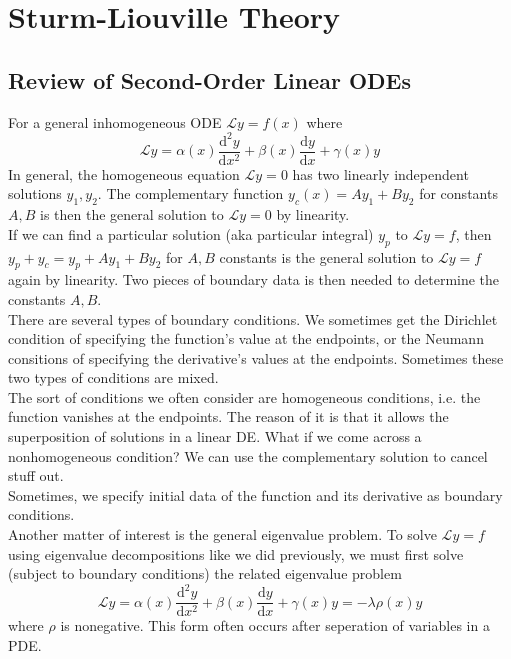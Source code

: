 \section{Sturm-Liouville Theory}
\subsection{Review of Second-Order Linear ODEs}
For a general inhomogeneous ODE $\mathcal Ly=f(x)$ where
$$\mathcal Ly=\alpha(x)\frac{\mathrm d^2y}{\mathrm dx^2}+\beta(x)\frac{\mathrm dy}{\mathrm dx}+\gamma(x)y$$
In general, the homogeneous equation $\mathcal Ly=0$ has two linearly independent solutions $y_1,y_2$.
The complementary function $y_c(x)=Ay_1+By_2$ for constants $A,B$ is then the general solution to $\mathcal Ly=0$ by linearity.\\
If we can find a particular solution (aka particular integral) $y_p$ to $\mathcal Ly=f$, then $y_p+y_c=y_p+Ay_1+By_2$ for $A,B$ constants is the general solution to $\mathcal Ly=f$ again by linearity.
Two pieces of boundary data is then needed to determine the constants $A,B$.\\
There are several types of boundary conditions.
We sometimes get the Dirichlet condition of specifying the function's value at the endpoints, or the Neumann consitions of specifying the derivative's values at the endpoints.
Sometimes these two types of conditions are mixed.\\
The sort of conditions we often consider are homogeneous conditions, i.e. the function vanishes at the endpoints.
The reason of it is that it allows the superposition of solutions in a linear DE.
What if we come across a nonhomogeneous condition?
We can use the complementary solution to cancel stuff out.\\
Sometimes, we specify initial data of the function and its derivative as boundary conditions.\\
Another matter of interest is the general eigenvalue problem.
To solve $\mathcal Ly=f$ using eigenvalue decompositions like we did previously, we must first solve (subject to boundary conditions) the related eigenvalue problem
$$\mathcal Ly=\alpha(x)\frac{\mathrm d^2y}{\mathrm dx^2}+\beta(x)\frac{\mathrm dy}{\mathrm dx}+\gamma(x)y=-\lambda\rho(x)y$$
where $\rho$ is nonegative.
This form often occurs after seperation of variables in a PDE.
